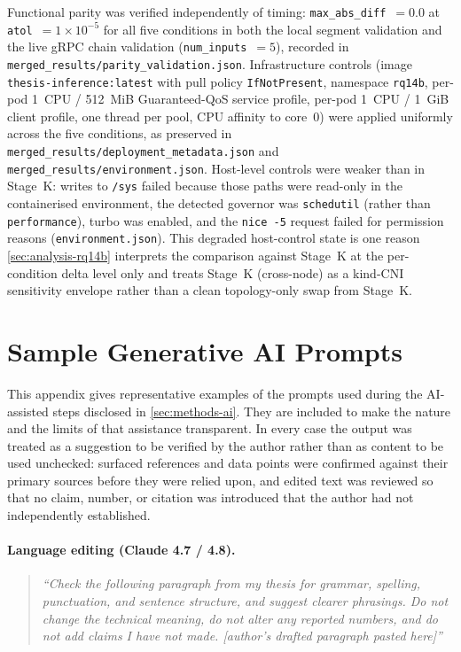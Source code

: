 Functional parity was verified independently of timing:
\texttt{max\_abs\_diff}~$=0.0$ at \texttt{atol}~$=1\times10^{-5}$ for
all five conditions in both the local segment validation and the live
gRPC chain validation (\texttt{num\_inputs}~$=5$), recorded in
\texttt{merged\_results/parity\_validation.json}. Infrastructure
controls (image
\texttt{thesis-inference:latest} with pull policy
\texttt{IfNotPresent}, namespace \texttt{rq14b}, per-pod 1~CPU /
512~MiB Guaranteed-QoS service profile, per-pod 1~CPU / 1~GiB client
profile, one thread per pool, CPU affinity to core~0) were applied
uniformly across the five conditions, as preserved in
\texttt{merged\_results/deployment\_metadata.json} and
\texttt{merged\_results/environment.json}. Host-level controls were
weaker than in Stage~K: writes to \texttt{/sys} failed because those
paths were read-only in the containerised environment, the detected
governor was \texttt{schedutil} (rather than \texttt{performance}),
turbo was enabled, and the \texttt{nice~-5} request failed for
permission reasons (\texttt{environment.json}). This degraded
host-control state is one reason \cref{sec:analysis-rq14b} interprets
the comparison against Stage~K at the per-condition delta level only and
treats Stage~K (cross-node) as a kind-CNI sensitivity envelope rather than a clean
topology-only swap from Stage~K.

\clearpage

\section{Sample Generative AI Prompts}
\label{sec:appendix-ai-prompts}

This appendix gives representative examples of the prompts used during the
AI-assisted steps disclosed in \cref{sec:methods-ai}. They are included to make the
nature and the limits of that assistance transparent. In every case the output was
treated as a suggestion to be verified by the author rather than as content to be used
unchecked: surfaced references and data points were confirmed against their primary
sources before they were relied upon, and edited text was reviewed so that no claim,
number, or citation was introduced that the author had not independently established.

\paragraph{Language editing (Claude 4.7 / 4.8).}
\begin{quote}
\itshape ``Check the following paragraph from my thesis for grammar, spelling,
punctuation, and sentence structure, and suggest clearer phrasings. Do not change the
technical meaning, do not alter any reported numbers, and do not add claims I have not
made. [author's drafted paragraph pasted here]''
\end{quote}

